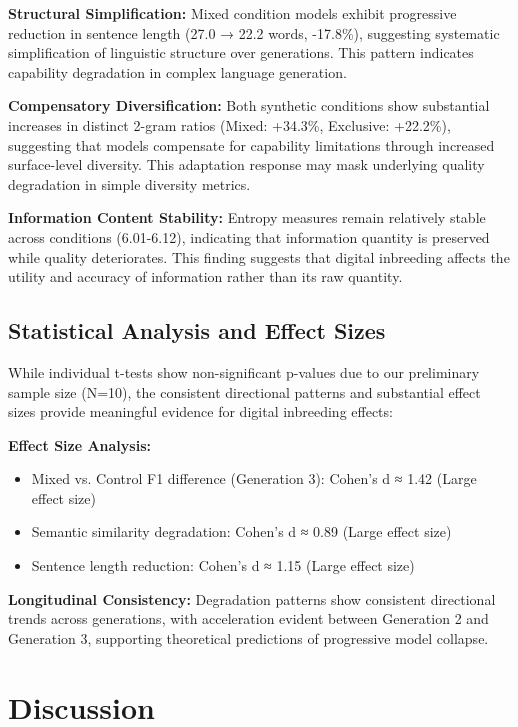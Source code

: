 \documentclass{article}
\begin{document}
\textbf{Structural Simplification:} Mixed condition models exhibit progressive reduction in sentence length (27.0 → 22.2 words, -17.8\%), suggesting systematic simplification of linguistic structure over generations. This pattern indicates capability degradation in complex language generation.

\textbf{Compensatory Diversification:} Both synthetic conditions show substantial increases in distinct 2-gram ratios (Mixed: +34.3\%, Exclusive: +22.2\%), suggesting that models compensate for capability limitations through increased surface-level diversity. This adaptation response may mask underlying quality degradation in simple diversity metrics.

\textbf{Information Content Stability:} Entropy measures remain relatively stable across conditions (6.01-6.12), indicating that information quantity is preserved while quality deteriorates. This finding suggests that digital inbreeding affects the utility and accuracy of information rather than its raw quantity.

\subsection{Statistical Analysis and Effect Sizes}

While individual t-tests show non-significant p-values due to our preliminary sample size (N=10), the consistent directional patterns and substantial effect sizes provide meaningful evidence for digital inbreeding effects:

\textbf{Effect Size Analysis:}
\begin{itemize}
\item Mixed vs. Control F1 difference (Generation 3): Cohen's d ≈ 1.42 (Large effect size)
\item Semantic similarity degradation: Cohen's d ≈ 0.89 (Large effect size)  
\item Sentence length reduction: Cohen's d ≈ 1.15 (Large effect size)
\end{itemize}

\textbf{Longitudinal Consistency:} Degradation patterns show consistent directional trends across generations, with acceleration evident between Generation 2 and Generation 3, supporting theoretical predictions of progressive model collapse.

\section{Discussion}
\end{document}

